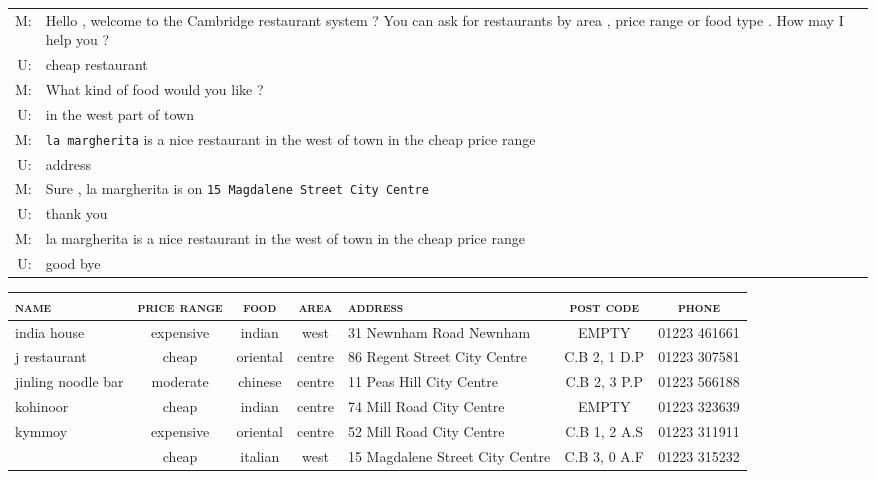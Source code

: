 \documentclass[11pt,letterpaper]{article}
\newcommand{\cellattn}[2]{\cellcolor{navyblue!#1}{#2}}
\begin{document}
\begin{table*}[!thbp]
  \centering
  \footnotesize
  \begin{subtable}{\textwidth}
    \begin{tabular}{r p{12cm}}
      M: & Hello , welcome to the Cambridge restaurant system ? You can ask for
           restaurants by area , price range or food type . How may I help you ? \\
      U: & cheap restaurant \\
      M: & What kind of food would you like ? \\
      U: & in the west part of town \\
      M: & \texttt{la margherita} is a nice restaurant in the west of town in the cheap price
           range \\
      U: & address \\
      M: & Sure , la margherita is on \texttt{15 Magdalene Street City Centre} \\
      U: & thank you \\
      M: & la margherita is a nice restaurant in the west of town in the cheap price
           range \\
      U: & good bye
    \end{tabular}
    \caption{Dialogue script}
  \end{subtable}
  \begin{subtable}{\textwidth}
  \begin{tabular}{| p{2cm} | c | c | c | p{3cm} | c | c |}
    \hline
    \textsc{name} & \textsc{price range} & \textsc{food} & \textsc{area} & \textsc{address} & \textsc{post code} & \textsc{phone} \\
    \hline
    india house & expensive & indian & west & 31 Newnham Road Newnham & EMPTY & 01223 461661 \\
    \hline
    j restaurant & cheap & oriental & centre & 86 Regent Street City Centre & C.B 2, 1 D.P & 01223 307581 \\
    \hline
    jinling noodle bar & moderate & chinese & centre & 11 Peas Hill City Centre & C.B 2, 3 P.P & 01223 566188 \\
    \hline
    kohinoor & cheap & indian & centre & 74 Mill Road City Centre & EMPTY & 01223 323639 \\
    \hline
    kymmoy & expensive & oriental & centre & 52 Mill Road City Centre & C.B 1, 2 A.S & 01223 311911 \\
    \hline
    \cellattn{44}{la margherita} & cheap & italian & west & 15 Magdalene Street City Centre & C.B 3, 0 A.F & 01223 315232 \\

\end{tabular}
\end{subtable}
\end{table*}
\end{document}
